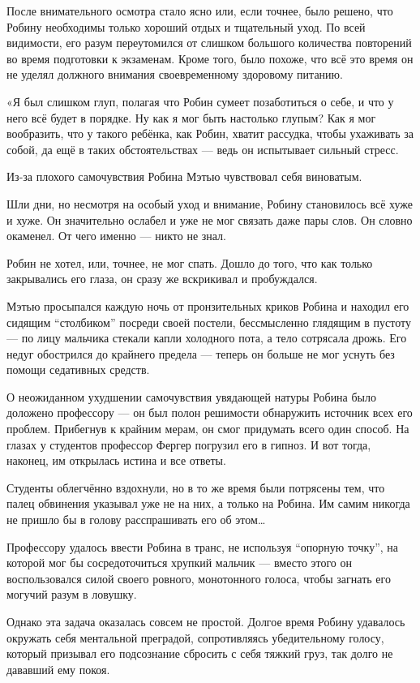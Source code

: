 \documentclass[a5paper, 9pt,
final, openany, twoside=true]{memoir}
\begin{document}
После внимательного осмотра стало ясно или, если точнее, было решено, что Робину необходимы только хороший отдых и тщательный уход. По всей видимости, его разум переутомился от слишком большого количества повторений во время подготовки к экзаменам. Кроме того, было похоже, что всё это время он не уделял должного внимания своевременному здоровому питанию.\bigskip

«Я был слишком глуп, полагая что Робин сумеет позаботиться о себе, и что у него всё будет в порядке. Ну как я мог быть настолько глупым? Как я мог вообразить, что у такого ребёнка, как Робин, хватит рассудка, чтобы ухаживать за собой, да ещё в таких обстоятельствах — ведь он испытывает сильный стресс.

Из-за плохого самочувствия Робина Мэтью чувствовал себя виноватым.\bigskip

Шли дни, но несмотря на особый уход и внимание, Робину становилось всё хуже и хуже. Он значительно ослабел и уже не мог связать даже пары слов. Он словно окаменел. От чего именно — никто не знал.

Робин не хотел, или, точнее, не мог спать. Дошло до того, что как только закрывались его глаза, он сразу же вскрикивал и пробуждался.

Мэтью просыпался каждую ночь от пронзительных криков Робина и находил его сидящим ``столбиком'' посреди своей постели, бессмысленно глядящим в пустоту — по лицу мальчика стекали капли холодного пота, а тело сотрясала дрожь. Его недуг обострился до крайнего предела — теперь он больше не мог уснуть без помощи седативных средств.\bigskip

О неожиданном ухудшении самочувствия увядающей натуры Робина было доложено профессору — он был полон решимости обнаружить источник всех его проблем. Прибегнув к крайним мерам, он смог придумать всего один способ. На глазах у студентов профессор Фергер погрузил его в гипноз. И вот тогда, наконец, им открылась истина и все ответы.

Студенты облегчённо вздохнули, но в то же время были потрясены тем, что палец обвинения указывал уже не на них, а только на Робина. Им самим никогда не пришло бы в голову расспрашивать его об этом…

Профессору удалось ввести Робина в транс, не используя ``опорную точку'', на которой мог бы сосредоточиться хрупкий мальчик — вместо этого он воспользовался силой своего ровного, монотонного голоса, чтобы загнать его могучий разум в ловушку.

Однако эта задача оказалась совсем не простой. Долгое время Робину удавалось окружать себя ментальной преградой, сопротивляясь убедительному голосу, который призывал его подсознание сбросить с себя тяжкий груз, так долго не дававший ему покоя.
\end{document}

